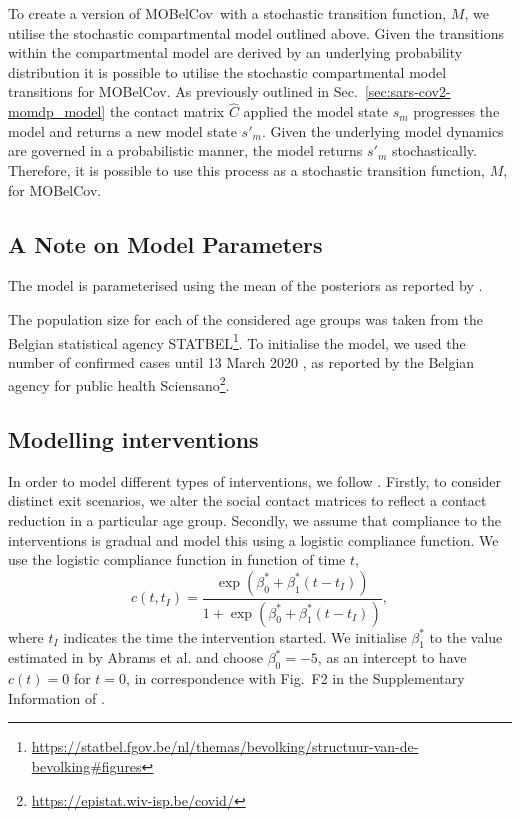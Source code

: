 \documentclass{article}
\renewcommand{\cite}[1]{\citep{#1}}
\newcommand{\momdpname}{MOBelCov}
\begin{document}
To create a version of \momdpname\ with a stochastic transition function, $M$, we utilise the stochastic compartmental model outlined above. Given the transitions within the compartmental model are derived by an underlying probability distribution it is possible to utilise the stochastic compartmental model transitions for \momdpname. As previously outlined in Sec.~\ref{sec:sars-cov2-momdp_model} the contact matrix $\hat{C}$ applied the model state $s_{m}$ progresses the model and returns a new model state $s'_{m}$. Given the underlying model dynamics are governed in a probabilistic manner, the model returns $s'_{m}$ stochastically. Therefore, it is possible to use this process as a stochastic transition function, $M$, for \momdpname. 

\subsection{A Note on Model Parameters}
\label{sec:compartment-model-parameters}

The model is parameterised using the mean of the posteriors as reported by \citet{abrams2021modelling}.

The population size for each of the considered age groups was taken from the Belgian statistical agency STATBEL\footnote{\url{https://statbel.fgov.be/nl/themas/bevolking/structuur-van-de-bevolking\#figures}}. To initialise the model, we used the number of confirmed cases until 13 March 2020 \cite{abrams2021modelling}, as reported by the Belgian agency for public health Sciensano\footnote{\url{https://epistat.wiv-isp.be/covid/}}.

\subsection{Modelling interventions}
\label{sec:compliance-function}
In order to model different types of interventions, we follow \citet{abrams2021modelling}. Firstly, to consider distinct exit scenarios, we alter the social contact matrices to reflect a contact reduction in a particular age group. Secondly, we assume that compliance to the interventions is gradual and model this using a logistic compliance function. We use the logistic compliance function in function of time $t$,
%
\begin{equation}
c(t,t_I) = \frac{\exp(\beta^*_0 + \beta^*_1(t-t_I))}{1+\exp(\beta^*_0 + \beta^*_1(t-t_I))},
\end{equation}
%
where $t_I$ indicates the time the intervention started. We initialise $\beta^*_1$ to the value estimated in by Abrams et al. and choose $\beta^*_0=-5$, as an intercept to have $c(t)=0$ for $t=0$, in correspondence with Fig.~F2 in the Supplementary Information of \citet{abrams2021modelling}.
\end{document}
